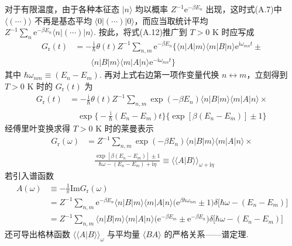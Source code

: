 对于有限温度，由于各种本征态 $|n\rangle$ 均以概率 $Z^{-1}\mathrm{e}^{-\beta E_{n}}$ 出现，这时式(A.7)中 $\langle(\cdots)\rangle$ 不再是基态平均 $\langle0|(\cdots)|0\rangle$，而应当取统计平均 $Z^{-1}\sum_{n}\mathrm{e}^{-\beta E_{n}}\langle n|(\cdots)|n\rangle$. 按此，将式(A.12)推广到 $T>0$ K 时应写成
\begin{equation}
\begin{aligned}
G_{\mathrm{r}}(t)&=-\frac{\mathrm{i}}{\hbar}\theta(t)Z^{-1}
\sum_{n,m}\mathrm{e}^{-\beta E_{n}}\bigl\{\langle n|A|m\rangle
\langle m|B|n\rangle\mathrm{e}^{\mathrm{i}\omega_{mn}t}\pm\\
&\qquad\langle n|B|m\rangle\langle m|A|n\rangle
\mathrm{e}^{-\mathrm{i}\omega_{mn}t}\bigr\}
\end{aligned}
\end{equation}
其中 $\hbar\omega_{nm}\equiv(E_{n}-E_{m})$. 再对上式右边第一项作变量代换 $n\leftrightarrow m$，立刻得到 $T>0$ K 时的 $G_{\mathrm{r}}(t)$ 为
\begin{equation}
\begin{aligned}
G_{\mathrm{r}}(t)&=-\frac{\mathrm{i}}{\hbar}\theta(t)Z^{-1}
\sum_{n,m}\exp(-\beta E_{n})\langle n|B|m\rangle
\langle m|A|n\rangle\times\\
&\quad\exp\biggl\{-\frac{\mathrm{i}}{\hbar}(E_{n}-E_{m})t\biggr\}
\bigl\{\exp[\beta(E_{n}-E_{m})]\pm1\bigr\}
\end{aligned}
\end{equation}
经傅里叶变换求得 $T>0$ K 时的莱曼表示
\begin{equation}
\begin{aligned}
G_{\mathrm{r}}(\omega)&=Z^{-1}\sum_{n,m}\exp(-\beta E_{n})
\langle n|B|m\rangle\langle m|A|n\rangle\times\\
&\quad\frac{\exp[\beta(E_{n}-E_{m})]\pm1}
{\hbar\omega-(E_{n}-E_{m})+\mathrm{i}\eta}
\equiv\langle\langle A|B\rangle\rangle_{\omega+\mathrm{i}\eta}
\end{aligned}
\end{equation}
若引入谱函数
\begin{equation}
\begin{aligned}
A(\omega)&\equiv-\frac{1}{\pi}\mathrm{Im}G_{\mathrm{r}}(\omega)\\
&=Z^{-1}\sum_{n,m}\mathrm{e}^{-\beta E_{n}}\langle n|B|m\rangle
\langle m|A|n\rangle\bigl(\mathrm{e}^{\beta\hbar\omega_{nm}}\pm1\bigr)
\delta\bigl[\hbar\omega-(E_{n}-E_{m})\bigr]\\
&=Z^{-1}\sum_{n,m}\langle n|B|m\rangle\langle m|A|n\rangle
\bigl(\mathrm{e}^{-\beta E_{m}}\pm\mathrm{e}^{-\beta E_{n}}\bigr)
\delta\bigl[\hbar\omega-(E_{n}-E_{m})\bigr]
\end{aligned}
\end{equation}
还可导出格林函数 $\langle\langle A|B\rangle\rangle_{\omega}$ 与平均量 $\langle BA\rangle$ 的严格关系——谱定理.

